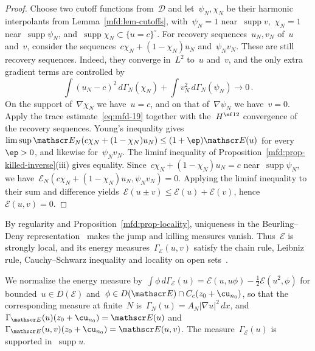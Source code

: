 \documentclass[11pt]{amsart}
\begin{document}
\begin{proof}
Choose two cutoff functions from~$\mathcal D$ and let~$\psi_N,\chi_N$ be their harmonic interpolants from Lemma~\ref{mfd:lem-cutoffs}, with~$\psi_N=1$ near~$\operatorname{supp}v$,~$\chi_N=1$ near~$\operatorname{supp}\psi_N$, and~$\operatorname{supp}\chi_N\subset\{u=c\}^\circ$. For recovery sequences~$u_N,v_N$ of~$u$ and~$v$, consider the sequences~$c\chi_N+(1-\chi_N)u_N$ and~$\psi_Nv_N$. These are still recovery sequences. Indeed, they converge in~$L^2$ to~$u$ and~$v$, and the only extra gradient terms are controlled by
\begin{equation*}
	\int(u_N-c)^2\,d\Gamma_N(\chi_N)
	+\int v_N^2\,d\Gamma_N(\psi_N)\longrightarrow0\,.
\end{equation*}
On the support of~$\nabla\chi_N$ we have~$u=c$, and on that of~$\nabla\psi_N$ we have~$v=0$. Apply the trace estimate~\eqref{eq:mfd-19} together with the~$H^{\nf12}$ convergence of the recovery sequences. Young's inequality gives~$\limsup \mathscr E_N(c\chi_N+(1-\chi_N)u_N)\leq(1+\ep)\mathscr E(u)$ for every~$\ep>0$, and likewise for~$\psi_Nv_N$. The liminf inequality of Proposition~\ref{mfd:prop-killed-inverse}(iii) gives equality. Since~$c\chi_N+(1-\chi_N)u_N=c$ near~$\operatorname{supp}\psi_N$, we have~$\mathscr E_N(c\chi_N+(1-\chi_N)u_N,\psi_Nv_N)=0$. Applying the liminf inequality to their sum and difference yields~$\mathscr E(u\pm v)\leq \mathscr E(u)+\mathscr E(v)$, hence~$\mathscr E(u,v)=0$.
\end{proof}

By regularity and Proposition~\ref{mfd:prop-locality}, uniqueness in the Beurling--Deny representation~\citep[Section~3.2]{FOT} makes the jump and killing measures vanish. Thus~$\mathscr E$ is strongly local, and its energy measures~$\Gamma_{\mathscr E}(u,v)$ satisfy the chain rule, Leibniz rule, Cauchy--Schwarz inequality and locality on open sets~\citep[Theorem~3.2.2 and Lemma~3.2.5]{FOT}.

\smallskip

We normalize the energy measure by~$\int\phi\,d\Gamma_{\mathscr E}(u)=\mathscr E(u,u\phi)-\frac{1}{2}\mathscr E(u^2,\phi)$ for bounded~$u\in D(\mathscr E)$ and~$\phi\in D(\mathscr E)\cap C_c(z_0+\cu_{n_0})$, so that the corresponding measure at finite~$N$ is~$\Gamma_N(u)=A_N|\nabla u|^2\,dx$, and~$\Gamma_{\mathscr E}(u)(z_0+\cu_{n_0})=\mathscr E(u)$ and~$\Gamma_{\mathscr E}(u,v)(z_0+\cu_{n_0})=\mathscr E(u,v)$. The measure~$\Gamma_{\mathscr E}(u)$ is supported in~$\operatorname{supp}u$.
\end{document}
